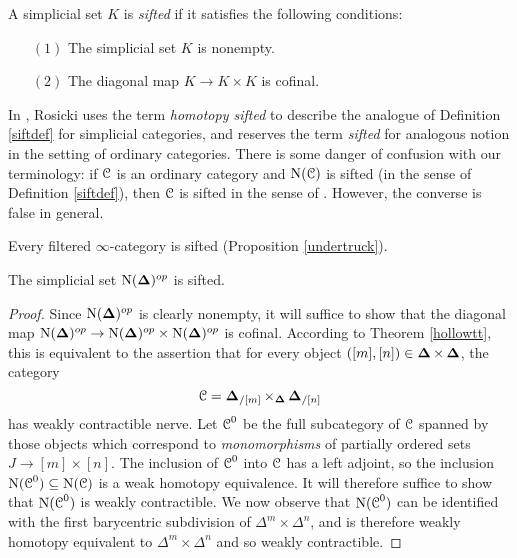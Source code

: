 \begin{definition}\label{siftdef}
A simplicial set $K$ is {\it sifted} if it satisfies the following conditions:
\begin{itemize}
\item[$(1)$] The simplicial set $K$ is nonempty.
\item[$(2)$] The diagonal map $K \rightarrow K \times K$ is cofinal.
\end{itemize}
\end{definition}

\begin{warning}
In \cite{homotopyvarieties}, Rosicki uses the term {\it homotopy sifted} to describe the analogue of Definition \ref{siftdef} for simplicial categories, and reserves the term {\it sifted} for analogous notion in the setting of ordinary categories. There is some danger of confusion with our terminology:
if $\operatorname{\mathcal{C}}$ is an ordinary category and $\operatorname{N}(\operatorname{\mathcal{C}})$ is sifted (in the sense of Definition \ref{siftdef}), then $\operatorname{\mathcal{C}}$ is sifted in the sense of \cite{homotopyvarieties}. However, the converse is false in general.
\end{warning}

\begin{example}\label{bin1}
Every filtered $\infty$-category is sifted (Proposition \ref{undertruck}). 
\end{example}

\begin{lemma}\label{bball3}
The simplicial set $\operatorname{N}( \operatorname{{\bf \Delta}})^{op}$ is sifted.
\end{lemma}

\begin{proof}
Since $\operatorname{N}(\operatorname{{\bf \Delta}})^{op}$ is clearly nonempty, it will suffice to show that the diagonal map
$\operatorname{N}( \operatorname{{\bf \Delta}})^{op} \rightarrow \operatorname{N}( \operatorname{{\bf \Delta}})^{op} \times \operatorname{N}(\operatorname{{\bf \Delta}})^{op}$ is cofinal.
According to Theorem \ref{hollowtt}, this is equivalent to the assertion that for every object
$([m], [n]) \in \operatorname{{\bf \Delta}} \times \operatorname{{\bf \Delta}}$, the category
$$ \operatorname{\mathcal{C}} = \operatorname{{\bf \Delta}}_{/ [m]} \times_{ \operatorname{{\bf \Delta}}} \operatorname{{\bf \Delta}}_{/ [n] }$$
has weakly contractible nerve. Let $\operatorname{\mathcal{C}}^{0}$ be the full subcategory of $\operatorname{\mathcal{C}}$
spanned by those objects which correspond to {\em monomorphisms} of partially ordered sets $J \rightarrow [m] \times [n]$. The inclusion of $\operatorname{\mathcal{C}}^{0}$ into $\operatorname{\mathcal{C}}$
has a left adjoint, so the inclusion $\operatorname{N}(\operatorname{\mathcal{C}}^{0}) \subseteq \operatorname{N}(\operatorname{\mathcal{C}})$ is a weak homotopy equivalence. It will therefore suffice to show that $\operatorname{N}(\operatorname{\mathcal{C}}^{0})$ is weakly contractible. We now observe that $\operatorname{N}(\operatorname{\mathcal{C}}^{0})$ can be identified with the first barycentric subdivision of
$\Delta^m \times \Delta^n$, and is therefore weakly homotopy equivalent to 
$\Delta^m \times \Delta^n$ and so weakly contractible.
\end{proof}

